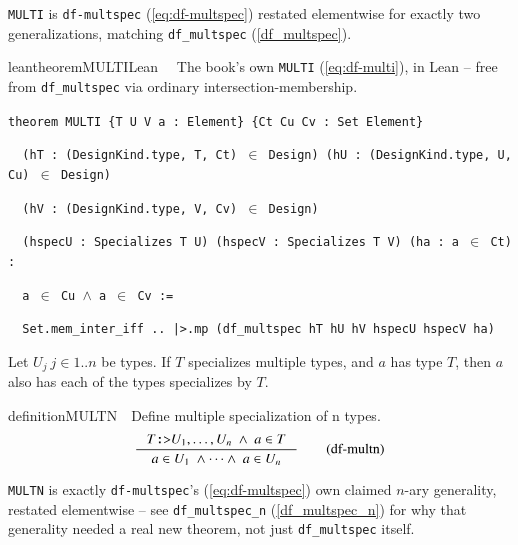 \pn \texttt{MULTI} is \texttt{df-multspec} (\ref{eq:df-multspec}) restated elementwise for exactly
two generalizations, matching \texttt{df\_multspec} (\ref{df_multspec}).

\begin{restatable}{leantheorem}{MULTILean}~~ The book's own \texttt{MULTI}
(\ref{eq:df-multi}), in Lean -- free from \texttt{df\_multspec} via ordinary
intersection-membership.

\texttt{\textcolor{leancolor}{theorem} \textcolor{leanyellow}{MULTI} \{T U V a : Element\} \{Ct Cu Cv : Set Element\}}

\texttt{~~(hT : (DesignKind.type, T, Ct) $\in$ Design) (hU : (DesignKind.type, U, Cu) $\in$ Design)}

\texttt{~~(hV : (DesignKind.type, V, Cv) $\in$ Design)}

\texttt{~~(hspecU : Specializes T U) (hspecV : Specializes T V) (ha : a $\in$ Ct) :}

\texttt{~~a $\in$ Cu $\wedge$ a $\in$ Cv :=}

\texttt{~~Set.mem\_inter\_iff .. |>.mp (df\_multspec hT hU hV hspecU hspecV ha)}
\label{MULTI}
\end{restatable}

Let $U_j~j\in 1 .. n$ be types.  If $T$ specializes multiple types, and $a$ has type $T$, then $a$ also
has each of the types specializes by $T$.
\begin{restatable}{definition}{MULTN}~~Define multiple specialization of n types.
\begin{align}
\inference
{T\texttt{:>}U_1,\ldots,U_n ~\wedge~a \in T}
{a \in U_1~\wedge \cdots \wedge~ a \in U_n}
\label{eq:df-multn}\tag{df-multn}
\end{align}
\end{restatable}

\pn \texttt{MULTN} is exactly \texttt{df-multspec}'s (\ref{eq:df-multspec}) own claimed $n$-ary
generality, restated elementwise -- see \texttt{df\_multspec\_n} (\ref{df_multspec_n}) for why that
generality needed a real new theorem, not just \texttt{df\_multspec} itself.

